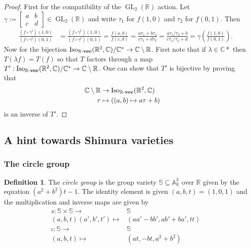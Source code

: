 \documentclass[a4paper,12pt,reqno]{amsart}
\newcommand{\field}[1]{\mathbb{#1}}  %
\newcommand{\R}{\field{R}} %
\newcommand{\C}{\field{C}} %
\newcommand{\A}{\field{A}}
\renewcommand{\SS}{\field{S}}
\newcommand{\IsoKVec}[1]{\mathrm{Iso}_{#1 {\bf\text{-}vec}}}
\newcommand{\transpose}{t}
\DeclareMathOperator{\GL}{GL}
\theoremstyle{definition}
\newtheorem{definition}[lemma]{Definition}
\numberwithin{lemma}{section}
\numberwithin{equation}{section}
\numberwithin{figure}{section}
\begin{document}
\begin{proof}
First for the compatibility of the $\GL_2(\R)$ action. Let $\gamma := \left [\begin{smallmatrix}
a & b \\ 
c & d
\end{smallmatrix}\right] \in \GL_2(\R)$ and write $\tau_1$ for $f(1,0)$ and $\tau_2$ for $f(0,1)$. Then
\begin{align*}
\frac {(f \circ \gamma^\transpose) (1,0)} {(f \circ \gamma^\transpose) (0,1)} &= \frac {(f \circ \gamma^\transpose) (1,0)} {(f \circ \gamma^\transpose) (0,1)}  =\frac {f(a,b)} {f(c,d)}  = \frac{a\tau_1+b\tau_2}{c\tau_1 + d\tau_2} =  \frac{a\tau_1/\tau_2+b}{c\tau_1/\tau_2 + d} = \gamma\left(\frac {f (1,0)} {f (0,1)}\right).
\end{align*}
Now for the bijection $\IsoKVec{\R}(\R^2,\C)/\C^* \to \C \setminus \R$. First note that if $\lambda \in \C*$ then $T(\lambda f) = T(f)$ so that $T$ factors through a map $T' : \IsoKVec{\R}(\R^2,\C)/\C^*  \to \C \setminus \R$. One can show that $T'$ is bijective by proving that 
\begin{align*}\C \setminus \R &\to \IsoKVec{\R}(\R^2,\C) & \\
\tau &\mapsto ((a,b) \mapsto a\tau +b)
\end{align*}
is an inverse of $T'$.
\end{proof}



\subsection{A hint towards Shimura varieties}

\subsubsection{The circle group}

\begin{definition}
	The \textit{circle group} is the group variety $\SS \subseteq \A^3_\R$ over $\R$ given by the equation $(a^2+b^2)t-1$. The identity element is given $(a,b,t)=(1,0,1)$ and the multiplication and inverse maps are given by
	\begin{align*}
	 s : \SS \times \SS \to& \SS \\
	   (a,b,t)(a',b',t') \mapsto& (aa'-bb',ab'+ba', tt) \\
	 \iota : \SS \to & \SS\\
	           (a,b,t) \mapsto& (at,-bt,a^2+b^2)
	\end{align*} 
\end{definition}
\end{document}
